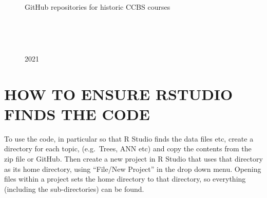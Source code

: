 \documentclass[
  letterpaper,
]{book}
\begin{document}
\begin{figure}
\begin{minipage}[t]{0.40\linewidth}
{{}

\caption{2021}

}

\end{minipage}%
%
\begin{minipage}[t]{0.05\linewidth}

{\centering 

~

}

\end{minipage}%
\newline
\begin{minipage}[t]{0.05\linewidth}

{\centering 

~

}

\end{minipage}%
%
\begin{minipage}[t]{0.40\linewidth}

{\centering 

GitHub repositories for historic CCBS courses

}

\end{minipage}%
%
\begin{minipage}[t]{0.10\linewidth}

{\centering 

~

}

\end{minipage}%
%
\begin{minipage}[t]{0.05\linewidth}

{\centering 

~

}

\end{minipage}%

\end{figure}

\hypertarget{how-to-ensure-rstudio-finds-the-code}{%
\section{HOW TO ENSURE RSTUDIO FINDS THE
CODE}\label{how-to-ensure-rstudio-finds-the-code}}

To use the code, in particular so that R Studio finds the data files
etc, create a directory for each topic, (e.g.~Trees, ANN etc) and copy
the contents from the zip file or GitHub. Then create a new project in R
Studio that uses that directory as its home directory, using ``File/New
Project'' in the drop down menu. Opening files within a project sets the
home directory to that directory, so everything (including the
sub-directories) can be found.
\end{document}

